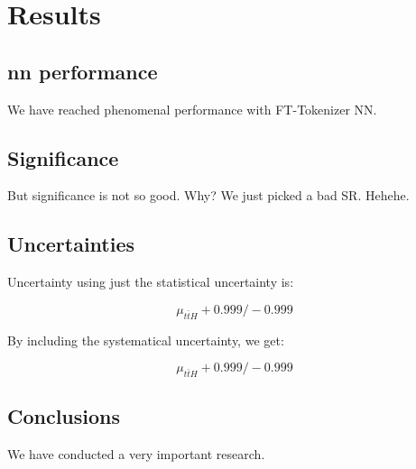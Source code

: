 \chapter{Results}

\section[NN performance]{\gls{nn} performance}

We have reached phenomenal performance with FT-Tokenizer NN.

\section{Significance}

But significance is not so good. Why? We just picked a bad SR. Hehehe.

\section{Uncertainties}

Uncertainty using just the statistical uncertainty is:

$$
    \mu_{t\bar{t}H} + 0.999 /-0.999
$$

By including the systematical uncertainty, we get:

$$
    \mu_{t\bar{t}H} + 0.999 /-0.999
$$

\section{Conclusions}

We have conducted a very important research.